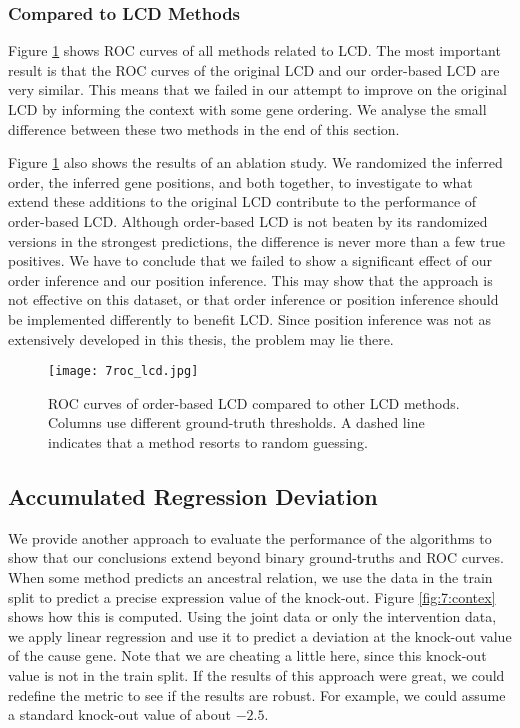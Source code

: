 \subsubsection{Compared to LCD Methods}

Figure \ref{fig:7:roclcd} shows ROC curves of all methods related to LCD. The most important result is that the ROC curves of the original LCD and our order-based LCD are very similar. This means that we failed in our attempt to improve on the original LCD by informing the context with some gene ordering. We analyse the small difference between these two methods in the end of this section.

Figure \ref{fig:7:roclcd} also shows the results of an ablation study. We randomized the inferred order, the inferred gene positions, and both together, to investigate to what extend these additions to the original LCD contribute to the performance of order-based LCD. Although order-based LCD is not beaten by its randomized versions in the strongest predictions, the difference is never more than a few true positives. We have to conclude that we failed to show a significant effect of our order inference and our position inference. This may show that the approach is not effective on this dataset, or that order inference or position inference should be implemented differently to benefit LCD. Since position inference was not as extensively developed in this thesis, the problem may lie there.

\begin{figure}[h]
    \centering
    \texttt{[image: 7roc\_lcd.jpg]}
    \caption{ROC curves of order-based LCD compared to other LCD methods. Columns use different ground-truth thresholds. A dashed line indicates that a method resorts to random guessing.}
    \label{fig:7:roclcd}
\end{figure}

\subsection{Accumulated Regression Deviation}

We provide another approach to evaluate the performance of the algorithms to show that our conclusions extend beyond binary ground-truths and ROC curves. When some method predicts an ancestral relation, we use the data in the train split to predict a precise expression value of the knock-out. Figure \ref{fig:7:contex} shows how this is computed. Using the joint data or only the intervention data, we apply linear regression and use it to predict a deviation at the knock-out value of the cause gene. Note that we are cheating a little here, since this knock-out value is not in the train split. If the results of this approach were great, we could redefine the metric to see if the results are robust. For example, we could assume a standard knock-out value of about $-2.5$.

